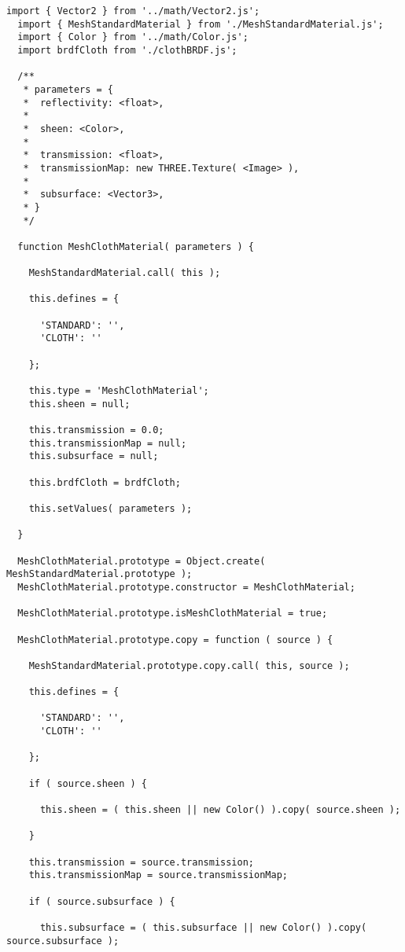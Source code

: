 \begin{lstlisting}[caption=Clase MeshClothMaterial]
  import { Vector2 } from '../math/Vector2.js';
  import { MeshStandardMaterial } from './MeshStandardMaterial.js';
  import { Color } from '../math/Color.js';
  import brdfCloth from './clothBRDF.js';
  
  /**
   * parameters = {
   *  reflectivity: <float>,
   *
   *  sheen: <Color>,
   *
   *  transmission: <float>,
   *  transmissionMap: new THREE.Texture( <Image> ),
   *
   *  subsurface: <Vector3>,
   * }
   */
  
  function MeshClothMaterial( parameters ) {
  
    MeshStandardMaterial.call( this );
  
    this.defines = {
  
      'STANDARD': '',
      'CLOTH': ''
  
    };
  
    this.type = 'MeshClothMaterial';
    this.sheen = null;
  
    this.transmission = 0.0;
    this.transmissionMap = null;
    this.subsurface = null;
  
    this.brdfCloth = brdfCloth;
  
    this.setValues( parameters );
  
  }
  
  MeshClothMaterial.prototype = Object.create( MeshStandardMaterial.prototype );
  MeshClothMaterial.prototype.constructor = MeshClothMaterial;
  
  MeshClothMaterial.prototype.isMeshClothMaterial = true;
  
  MeshClothMaterial.prototype.copy = function ( source ) {
  
    MeshStandardMaterial.prototype.copy.call( this, source );
  
    this.defines = {
  
      'STANDARD': '',
      'CLOTH': ''
  
    };
  
    if ( source.sheen ) {
  
      this.sheen = ( this.sheen || new Color() ).copy( source.sheen );
  
    }
  
    this.transmission = source.transmission;
    this.transmissionMap = source.transmissionMap;
  
    if ( source.subsurface ) {
  
      this.subsurface = ( this.subsurface || new Color() ).copy( source.subsurface );
  

\end{lstlisting}
